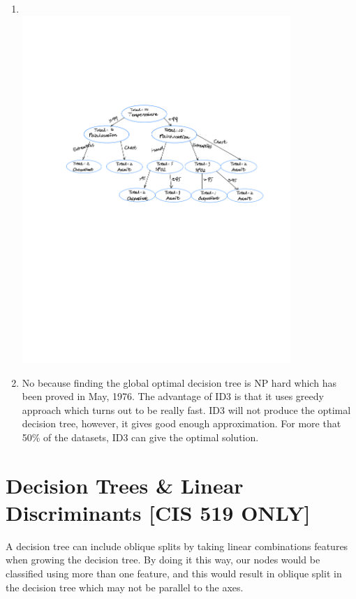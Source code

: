 \documentclass{article}
\begin{document}
\begin{enumerate}[label=\alph*.]
            \item %
            ~\\
            
            \includegraphics[width=0.8\textwidth]{HW1_Graph1}
                        
            \item %
            No because finding the global optimal decision tree is NP hard  which has been proved in May, 1976. The advantage of ID3 is that it uses greedy approach which turns out to be really fast. ID3 will not produce the optimal decision tree, however, it gives good enough approximation. For more that 50\% of the datasets, ID3 can give the optimal solution.
        \end{enumerate}
        
       \section{Decision Trees \& Linear Discriminants [CIS 519 ONLY]}
        
        A decision tree can include oblique splits by taking linear combinations features when growing the decision tree. By doing it this way, our nodes would be classified using more than one feature, and this would result in oblique split in the decision tree which may not be parallel to the axes.
        
\end{document}
